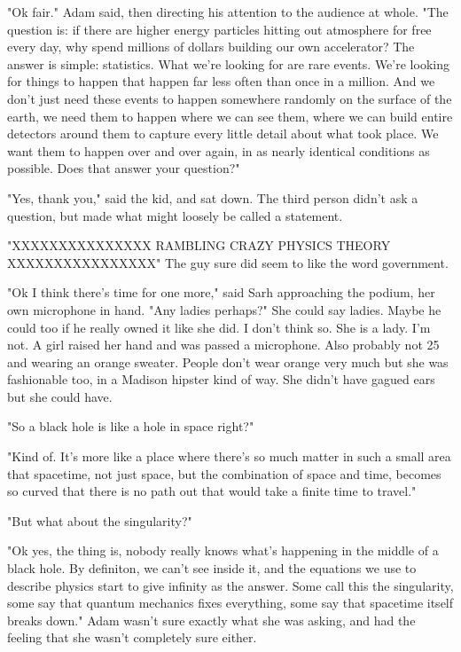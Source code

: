 "Ok fair." Adam said, then directing his attention to the audience at whole. "The question is: if there are higher energy particles hitting out atmosphere for free every day, why spend millions of dollars building our own accelerator? The answer is simple: statistics. What we're looking for are rare events. We're looking for things to happen that happen far less often than once in a million. And we don't just need these events to happen somewhere randomly on the surface of the earth, we need them to happen where we can see them, where we can build entire detectors around them to capture every little detail about what took place. We want them to happen over and over again, in as nearly identical conditions as possible. Does that answer your question?"

"Yes, thank you," said the kid, and sat down. The third person didn't ask a question, but made what might loosely be called a statement. 

"XXXXXXXXXXXXXXX RAMBLING CRAZY PHYSICS THEORY XXXXXXXXXXXXXXXX" The guy sure did seem to like the word government.

\mypause

"Ok I think there's time for one more," said Sarh approaching the podium, her own microphone in hand. "Any ladies perhaps?" She could say ladies. Maybe he could too if he really owned it like she did. I don't think so. She is a lady. I'm not. A girl raised her hand and was passed a microphone. Also probably not 25 and wearing an orange sweater. People don't wear orange very much but she was fashionable too, in a Madison hipster kind of way. She didn't have gagued ears but she could have. 

"So a black hole is like a hole in space right?"

"Kind of. It's more like a place where there's so much matter in such a small area that spacetime, not just space, but the combination of space and time, becomes so curved that there is no path out that would take a finite time to travel." 

"But what about the singularity?"

"Ok yes, the thing is, nobody really knows what's happening in the middle of a black hole. By definiton, we can't see inside it, and the equations we use to describe physics start to give infinity as the answer. Some call this the singularity, some say that quantum mechanics fixes everything, some say that spacetime itself breaks down." Adam wasn't sure exactly what she was asking, and had the feeling that she wasn't completely sure either.

